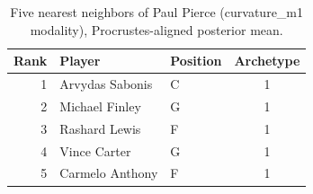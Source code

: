 \begin{table}[htbp]
  \centering\small
  \begin{tabular}{rllc}
    \toprule
    Rank & Player & Position & Archetype \\
    \midrule
    1 & Arvydas Sabonis & C & 1 \\
    2 & Michael Finley & G & 1 \\
    3 & Rashard Lewis & F & 1 \\
    4 & Vince Carter & G & 1 \\
    5 & Carmelo Anthony & F & 1 \\
    \bottomrule
  \end{tabular}
  \caption{Five nearest neighbors of Paul Pierce (curvature_m1 modality), Procrustes-aligned posterior mean.}
  \label{tab:Paul_Pierce_neighbors_curvature_m1}
\end{table}

